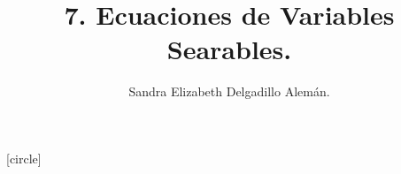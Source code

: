 
\title{7. Ecuaciones de Variables Searables.}
\author{Sandra Elizabeth Delgadillo Alemán.}

[circle] %

\newcommand{\dis}{\displaystyle} 
\setlength\fboxrule{1.5pt}
